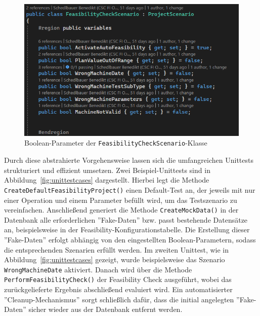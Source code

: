 \begin{figure}[!htb]
    \centering
    \includegraphics[width=1\textwidth]{bilder/unittests-parameters.png}
    \caption{Boolean-Parameter der \texttt{FeasibilityCheckScenario}-Klasse}
    \label{fig:unittests-parameters}
\end{figure}

Durch diese abstrahierte Vorgehensweise lassen sich die umfangreichen Unittests strukturiert und effizient umsetzen. Zwei Beispiel-Unittests sind in Abbildung~\ref{fig:unittestcases} dargestellt. Hierbei legt die Methode \texttt{CreateDefaultFeasibilityProject()} einen Default-Test an, der jeweils mit nur einer Operation und einem Parameter befüllt wird, um das Testszenario zu vereinfachen. Anschließend generiert die Methode \texttt{CreateMockData()} in der Datenbank alle erforderlichen ''Fake-Daten'' bzw. passt bestehende Datensätze an, beispielsweise in der Feasibility-Konfigurationstabelle. Die Erstellung dieser ''Fake-Daten'' erfolgt abhängig von den eingestellten Boolean-Parametern, sodass die entsprechenden Szenarien erfüllt werden. Im zweiten Unittest, wie in Abbildung~\ref{fig:unittestcases} gezeigt, wurde beispielsweise das Szenario \texttt{WrongMachineDate} aktiviert. Danach wird über die Methode \texttt{PerformFeasibilityCheck()} der Feasibility Check ausgeführt, wobei das zurückgelieferte Ergebnis abschließend evaluiert wird. Ein automatisierter ''Cleanup-Mechanismus'' sorgt schließlich dafür, dass die initial angelegten ''Fake-Daten'' sicher wieder aus der Datenbank entfernt werden.

